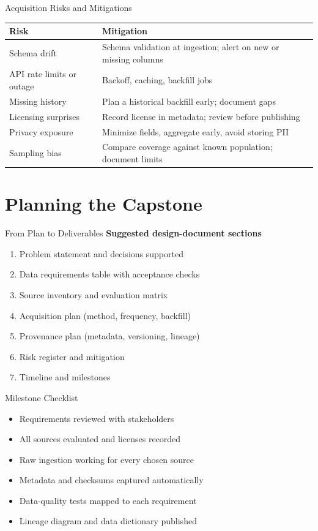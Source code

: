 \documentclass[aspectratio=43,11pt]{beamer}
\begin{document}
\begin{frame}{Acquisition Risks and Mitigations}
  \footnotesize
  \begin{tabular}{@{}p{3.4cm}p{6.7cm}@{}}
    \toprule
    \textbf{Risk} & \textbf{Mitigation} \\
    \midrule
    Schema drift & Schema validation at ingestion; alert on new or missing columns \\[3pt]
    API rate limits or outage & Backoff, caching, backfill jobs \\[3pt]
    Missing history & Plan a historical backfill early; document gaps \\[3pt]
    Licensing surprises & Record license in metadata; review before publishing \\[3pt]
    Privacy exposure & Minimize fields, aggregate early, avoid storing PII \\[3pt]
    Sampling bias & Compare coverage against known population; document limits \\
    \bottomrule
  \end{tabular}
\end{frame}

\section{Planning the Capstone}

\begin{frame}{From Plan to Deliverables}
  \textbf{Suggested design-document sections}
  \begin{enumerate}
    \item Problem statement and decisions supported
    \item Data requirements table with acceptance checks
    \item Source inventory and evaluation matrix
    \item Acquisition plan (method, frequency, backfill)
    \item Provenance plan (metadata, versioning, lineage)
    \item Risk register and mitigation
    \item Timeline and milestones
  \end{enumerate}
\end{frame}

\begin{frame}{Milestone Checklist}
  \begin{itemize}
    \item[$\square$] Requirements reviewed with stakeholders
    \item[$\square$] All sources evaluated and licenses recorded
    \item[$\square$] Raw ingestion working for every chosen source
    \item[$\square$] Metadata and checksums captured automatically
    \item[$\square$] Data-quality tests mapped to each requirement
    \item[$\square$] Lineage diagram and data dictionary published
  \end{itemize}
\end{frame}
\end{document}

